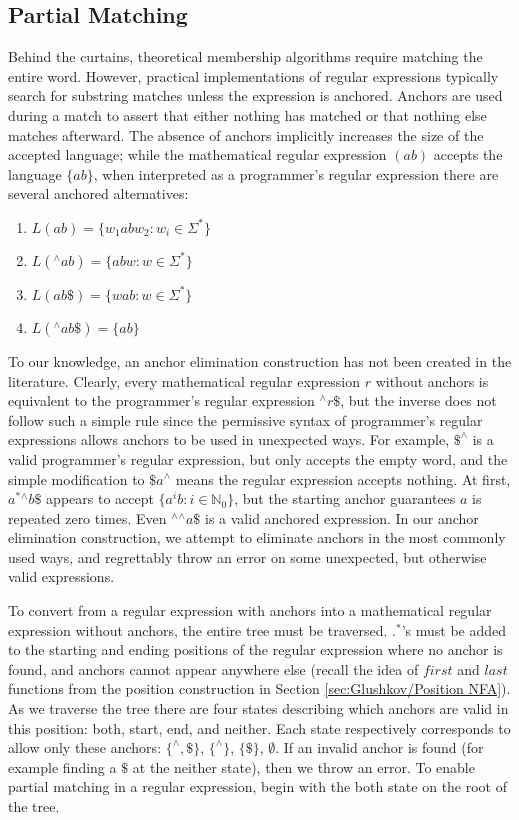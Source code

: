 \subsection{Partial Matching}
\label{subsec:Partial Matching}
Behind the curtains, theoretical membership algorithms require matching the entire word. However, practical implementations of regular expressions typically search for substring matches unless the expression is anchored. Anchors are used during a match to assert that either nothing has matched or that nothing else matches afterward. The absence of anchors implicitly increases the size of the accepted language; while the mathematical regular expression $(a b)$ accepts the language $\{ab\}$, when interpreted as a programmer's regular expression there are several anchored alternatives:

\begin{enumerate}
  \item $L(ab) = \{w_1 ab w_2 : w_i \in \Sigma ^*\}$
  \item $L(^\wedge ab) = \{ab w : w \in \Sigma ^*\}$
  \item $L(ab \$) = \{w ab : w \in \Sigma ^*\}$
  \item $L(^\wedge ab \$) = \{ab\}$
\end{enumerate}

To our knowledge, an anchor elimination construction has not been created in the literature. Clearly, every mathematical regular expression $r$ without anchors is equivalent to the programmer's regular expression $^\wedge r \$$, but the inverse does not follow such a simple rule since the permissive syntax of programmer's regular expressions allows anchors to be used in unexpected ways. For example, $\$^\wedge$ is a valid programmer's regular expression, but only accepts the empty word, and the simple modification to $\$a^\wedge$ means the regular expression accepts nothing. At first, $a^*{}^\wedge b\$$ appears to accept $\{a^ib : i \in \mathbb{N}_0\}$, but the starting anchor guarantees $a$ is repeated zero times. Even $^\wedge{}^\wedge a \$$ is a valid anchored expression. In our anchor elimination construction, we attempt to eliminate anchors in the most commonly used ways, and regrettably throw an error on some unexpected, but otherwise valid expressions.

To convert from a regular expression with anchors into a mathematical regular expression without anchors, the entire tree must be traversed. $.^*$'s must be added to the starting and ending positions of the regular expression where no anchor is found, and anchors cannot appear anywhere else (recall the idea of $first$ and $last$ functions from the position construction in Section \ref{sec:Glushkov/Position NFA}). As we traverse the tree there are four states describing which anchors are valid in this position: both, start, end, and neither. Each state respectively corresponds to allow only these anchors: $\{^\wedge, \$\}$, $\{^\wedge\}$, $\{\$\}$, $\emptyset$. If an invalid anchor is found (for example finding a $\$$ at the neither state), then we throw an error. To enable partial matching in a regular expression, begin with the both state on the root of the tree.

